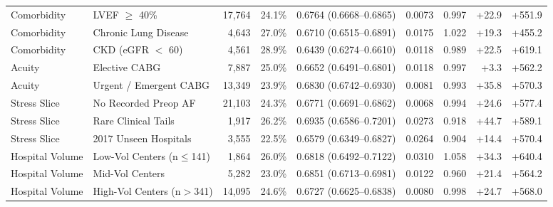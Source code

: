 \begin{table}[t]
\begin{tabularx}{\textwidth}{@{}L{2.0cm}Yrrrrrrr@{}}
Comorbidity & LVEF $\ge$ 40\% & 17,764 & 24.1\% & 0.6764 (0.6668--0.6865) & 0.0073 & 0.997 & +22.9 & +551.9 \\
Comorbidity & Chronic Lung Disease & 4,643 & 27.0\% & 0.6710 (0.6515--0.6891) & 0.0175 & 1.022 & +19.3 & +455.2 \\
Comorbidity & CKD (eGFR $<$ 60) & 4,561 & 28.9\% & 0.6439 (0.6274--0.6610) & 0.0118 & 0.989 & +22.5 & +619.1 \\
Acuity & Elective CABG & 7,887 & 25.0\% & 0.6652 (0.6491--0.6801) & 0.0118 & 0.997 & +3.3 & +562.2 \\
Acuity & Urgent / Emergent CABG & 13,349 & 23.9\% & 0.6830 (0.6742--0.6930) & 0.0081 & 0.993 & +35.8 & +570.3 \\
Stress Slice & No Recorded Preop AF & 21,103 & 24.3\% & 0.6771 (0.6691--0.6862) & 0.0068 & 0.994 & +24.6 & +577.4 \\
Stress Slice & Rare Clinical Tails & 1,917 & 26.2\% & 0.6935 (0.6586--0.7201) & 0.0273 & 0.918 & +44.7 & +589.1 \\
Stress Slice & 2017 Unseen Hospitals & 3,555 & 22.5\% & 0.6579 (0.6349--0.6827) & 0.0264 & 0.904 & +14.4 & +570.4 \\
Hospital Volume & Low-Vol Centers (n$\le$141) & 1,864 & 26.0\% & 0.6818 (0.6492--0.7122) & 0.0310 & 1.058 & +34.3 & +640.4 \\
Hospital Volume & Mid-Vol Centers & 5,282 & 23.0\% & 0.6851 (0.6713--0.6981) & 0.0122 & 0.960 & +21.4 & +564.2 \\
Hospital Volume & High-Vol Centers (n$>$341) & 14,095 & 24.6\% & 0.6727 (0.6625--0.6838) & 0.0080 & 0.998 & +24.7 & +568.0 \\
\bottomrule
\end{tabularx}
\end{table}
